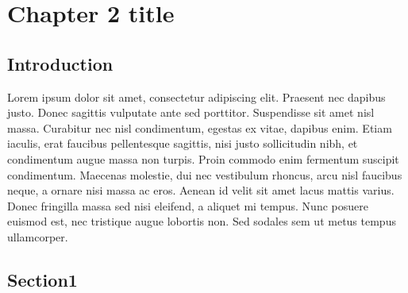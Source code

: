 \chapter{Chapter 2 title}
\label{chap:Chapter 2 title}
\section*{Introduction}


Lorem ipsum dolor sit amet, consectetur adipiscing elit. Praesent nec dapibus justo. Donec sagittis vulputate ante sed porttitor. Suspendisse sit amet nisl massa. Curabitur nec nisl condimentum, egestas ex vitae, dapibus enim. Etiam iaculis, erat faucibus pellentesque sagittis, nisi justo sollicitudin nibh, et condimentum augue massa non turpis. Proin commodo enim fermentum suscipit condimentum. Maecenas molestie, dui nec vestibulum rhoncus, arcu nisl faucibus neque, a ornare nisi massa ac eros. Aenean id velit sit amet lacus mattis varius. Donec fringilla massa sed nisi eleifend, a aliquet mi tempus. Nunc posuere euismod est, nec tristique augue lobortis non. Sed sodales sem ut metus tempus ullamcorper.


\pagebreak


\section{Section1}


